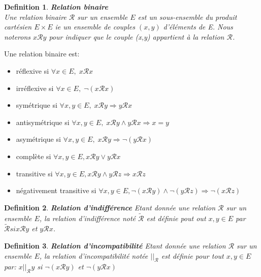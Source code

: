 \documentclass[a4paper,12pt,openany,oneside]{article}
\newtheorem{defn}{Definition} %
\begin{document}
\begin{defn}\textbf{Relation binaire}\\

Une relation binaire $\mathcal{R}$ sur un ensemble $E$ est un sous-ensemble du produit cartésien $E \times E$ ie un ensemble de couples $(x,y)$ d'éléments de E.
Nous noterons $x\mathcal{R}y$ pour indiquer que le couple (x,y) appartient à la relation $\mathcal{R}$.
\end{defn}

Une relation binaire est:

\begin{itemize}
        \item réflexive si $\forall x\in E,\; x\mathcal{R}x$
        \item irréflexive si $\forall x\in E,\; \neg(x\mathcal{R}x)$
        \item symétrique si $\forall x,y\in E,\; x\mathcal{R}y\Rightarrow y\mathcal{R}x$
        \item antisymétrique si $\forall x,y\in E,\; x\mathcal{R}y\wedge y\mathcal{R}x\Rightarrow x=y$
        \item asymétrique si $\forall x,y\in E,\; x\mathcal{R}y\Rightarrow \neg(y\mathcal{R}x)$
        \item complète si $\forall x,y\in E, x\mathcal{R} y\vee y\mathcal{R}x$
        \item transitive si $\forall x,y\in E, x\mathcal{R} y\wedge y\mathcal{R}z\Rightarrow x\mathcal{R}z$
        \item négativement transitive si $\forall x,y\in E, \neg (x\mathcal{R} y)\wedge \neg (y\mathcal{R}z)\Rightarrow \neg(x\mathcal{R}z)$

\end{itemize}


\begin{defn}\textbf{Relation d'indifférence}
        Etant donnée une relation $\mathcal{R}$  sur un ensemble $E$, la relation d'indifférence noté $\tilde{\mathcal{R}}$ est définie pout out $x,y\in E$ par $\tilde{\mathcal{R}} si x\mathcal{R}y$ et $y\mathcal{R}x$.
\end{defn}

\begin{defn}\textbf{Relation d'incompatibilité}
        Etant donnée une relation $\mathcal{R}$ sur un ensemble $E$, la relation d'incompatibilité notée $||_{\mathcal{R}}$ est définie pour tout $x,y\in E$ par: $x||_{\mathcal{R}}y$ si $\neg(x\mathcal{R}y)$ et $\neg (y\mathcal{R}x)$
\end{defn}
\end{document}
